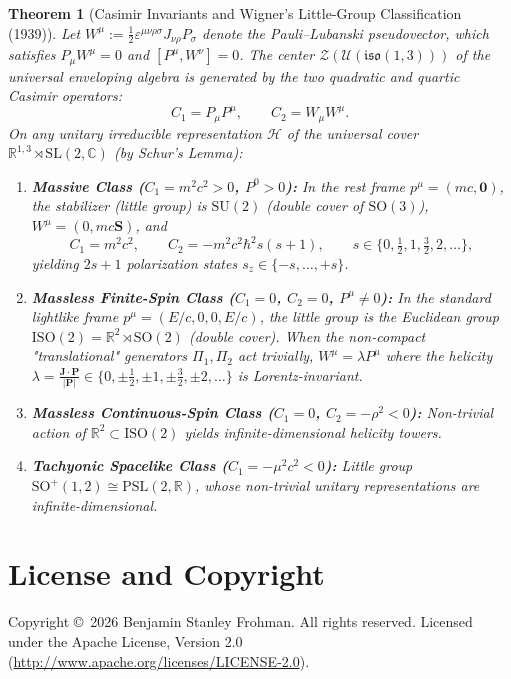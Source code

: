 \documentclass[11pt]{article}
\newtheorem{theorem}{Theorem}[section]
\begin{document}
\begin{theorem}[Casimir Invariants and Wigner's Little-Group Classification (1939)]
Let $W^\mu := \frac{1}{2}\varepsilon^{\mu\nu\rho\sigma} J_{\nu\rho} P_\sigma$ denote the Pauli--Lubanski pseudovector, which satisfies $P_\mu W^\mu = 0$ and $[P^\mu, W^\nu] = 0$. The center $\mathcal{Z}(\mathcal{U}(\mathfrak{iso}(1,3)))$ of the universal enveloping algebra is generated by the two quadratic and quartic Casimir operators:
\[
C_1 = P_\mu P^\mu, \qquad C_2 = W_\mu W^\mu.
\]
On any unitary irreducible representation $\mathcal{H}$ of the universal cover $\mathbb{R}^{1,3} \rtimes \mathrm{SL}(2,\mathbb{C})$ (by Schur's Lemma):
\begin{enumerate}
  \item \textbf{Massive Class ($C_1 = m^2 c^2 > 0$, $P^0 > 0$):} In the rest frame $p^\mu = (mc, \mathbf{0})$, the stabilizer (little group) is $\mathrm{SU}(2)$ (double cover of $\mathrm{SO}(3)$), $W^\mu = (0, mc\mathbf{S})$, and
  \[
  C_1 = m^2 c^2, \qquad C_2 = -m^2 c^2 \hbar^2 s(s+1), \qquad s \in \bigl\{0, \tfrac{1}{2}, 1, \tfrac{3}{2}, 2, \dots\bigr\},
  \]
  yielding $2s+1$ polarization states $s_z \in \{-s, \dots, +s\}$.
  \item \textbf{Massless Finite-Spin Class ($C_1 = 0$, $C_2 = 0$, $P^\mu \neq 0$):} In the standard lightlike frame $p^\mu = (E/c, 0, 0, E/c)$, the little group is the Euclidean group $\mathrm{ISO}(2) = \mathbb{R}^2 \rtimes \mathrm{SO}(2)$ (double cover). When the non-compact "translational" generators $\Pi_1, \Pi_2$ act trivially, $W^\mu = \lambda P^\mu$ where the helicity $\lambda = \frac{\mathbf{J}\cdot\mathbf{P}}{|\mathbf{P}|} \in \{0, \pm\tfrac{1}{2}, \pm 1, \pm\tfrac{3}{2}, \pm 2, \dots\}$ is Lorentz-invariant.
  \item \textbf{Massless Continuous-Spin Class ($C_1 = 0$, $C_2 = -\rho^2 < 0$):} Non-trivial action of $\mathbb{R}^2 \subset \mathrm{ISO}(2)$ yields infinite-dimensional helicity towers.
  \item \textbf{Tachyonic Spacelike Class ($C_1 = -\mu^2 c^2 < 0$):} Little group $\mathrm{SO}^+(1,2) \cong \mathrm{PSL}(2,\mathbb{R})$, whose non-trivial unitary representations are infinite-dimensional.
\end{enumerate}
\end{theorem}

\section*{License and Copyright}
Copyright \copyright\ 2026 Benjamin Stanley Frohman. All rights reserved. Licensed under the Apache License, Version 2.0 (\url{http://www.apache.org/licenses/LICENSE-2.0}).
\end{document}
